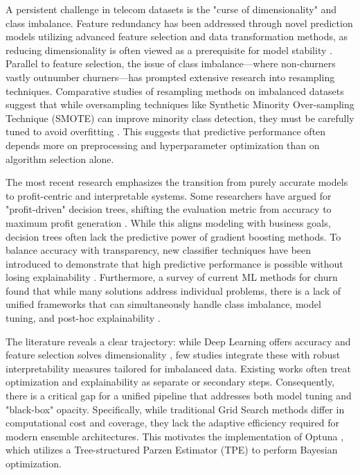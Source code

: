 \documentclass[a4paper,twoside]{article}
\begin{document}
A persistent challenge in telecom datasets is the "curse of dimensionality" and class imbalance. Feature redundancy has been addressed through novel prediction models utilizing advanced feature selection and data transformation methods, as reducing dimensionality is often viewed as a prerequisite for model stability \cite{Sana2022}. Parallel to feature selection, the issue of class imbalance—where non-churners vastly outnumber churners—has prompted extensive research into resampling techniques. Comparative studies of resampling methods on imbalanced datasets suggest that while oversampling techniques like Synthetic Minority Over-sampling Technique (SMOTE) can improve minority class detection, they must be carefully tuned to avoid overfitting \cite{Haddadi2024}. This suggests that predictive performance often depends more on preprocessing and hyperparameter optimization than on algorithm selection alone.

The most recent research emphasizes the transition from purely accurate models to profit-centric and interpretable systems. Some researchers have argued for "profit-driven" decision trees, shifting the evaluation metric from accuracy to maximum profit generation \cite{Hppner2020}. While this aligns modeling with business goals, decision trees often lack the predictive power of gradient boosting methods. To balance accuracy with transparency, new classifier techniques have been introduced to demonstrate that high predictive performance is possible without losing explainability \cite{DeBock2021}. Furthermore, a survey of current ML methods for churn found that while many solutions address individual problems, there is a lack of unified frameworks that can simultaneously handle class imbalance, model tuning, and post-hoc explainability \cite{Manzoor2024}.

The literature reveals a clear trajectory: while Deep Learning offers accuracy \cite{Saha2024} and feature selection solves dimensionality \cite{Sana2022}, few studies integrate these with robust interpretability measures tailored for imbalanced data. Existing works often treat optimization and explainability as separate or secondary steps. Consequently, there is a critical gap for a unified pipeline that addresses both model tuning and "black-box" opacity. Specifically, while traditional Grid Search methods differ in computational cost and coverage, they lack the adaptive efficiency required for modern ensemble architectures. This motivates the implementation of Optuna \cite{akiba2019optuna}, which utilizes a Tree-structured Parzen Estimator (TPE) \cite{watanabe2023tree} to perform Bayesian optimization.
\end{document}
